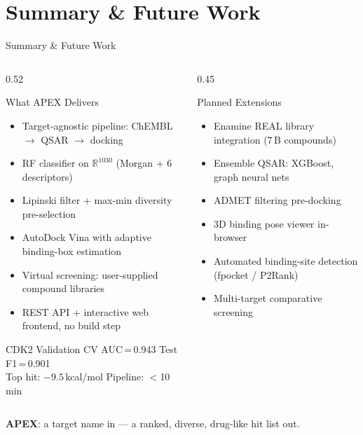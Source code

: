 \section{Summary \& Future Work}

\begin{frame}{Summary \& Future Work}
  \begin{columns}[T]
    \begin{column}{0.52\textwidth}
      \begin{block}{What APEX Delivers}
        \begin{itemize}
          \item Target-agnostic pipeline: ChEMBL $\rightarrow$ QSAR $\rightarrow$ docking
          \item RF classifier on $\mathbb{R}^{1030}$ (Morgan + 6 descriptors)
          \item Lipinski filter + max-min diversity pre-selection
          \item AutoDock Vina with adaptive binding-box estimation
          \item Virtual screening: user-supplied compound libraries
          \item REST API + interactive web frontend, no build step
        \end{itemize}
      \end{block}
      \vspace{0.2cm}
      \begin{block}{CDK2 Validation}
        CV AUC\,=\,0.943 \quad Test F1\,=\,0.901\\
        Top hit: $-9.5$\,kcal/mol \quad Pipeline: $<$10\,min
      \end{block}
    \end{column}
    \begin{column}{0.45\textwidth}
      \begin{exampleblock}{Planned Extensions}
        \begin{itemize}
          \item Enamine REAL library integration (7\,B compounds)
          \item Ensemble QSAR: XGBoost, graph neural nets
          \item ADMET filtering pre-docking
          \item 3D binding pose viewer in-browser
          \item Automated binding-site detection (fpocket / P2Rank)
          \item Multi-target comparative screening
        \end{itemize}
      \end{exampleblock}
    \end{column}
  \end{columns}

  \vspace{0.4cm}
  \begin{center}
    \large\textbf{APEX}: a target name in — a ranked, diverse, drug-like hit list out.
  \end{center}
\end{frame}

